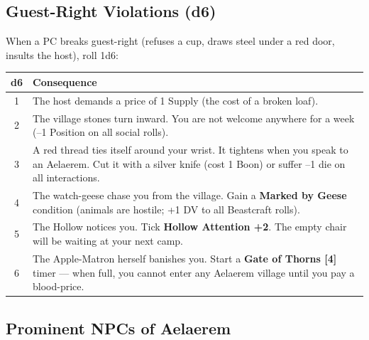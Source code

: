 \subsection*{Guest-Right Violations (d6)}
When a PC breaks guest-right (refuses a cup, draws steel under a red door, insults the host), roll 1d6:
\begin{center}
\begin{tabular}{|c|l|}
\hline
\textbf{d6} & \textbf{Consequence} \\
\hline
1 & The host demands a price of 1 Supply (the cost of a broken loaf). \\
2 & The village stones turn inward. You are not welcome anywhere for a week (--1 Position on all social rolls). \\
3 & A red thread ties itself around your wrist. It tightens when you speak to an Aelaerem. Cut it with a silver knife (cost 1 Boon) or suffer --1 die on all interactions. \\
4 & The watch-geese chase you from the village. Gain a \textbf{Marked by Geese} condition (animals are hostile; +1 DV to all Beastcraft rolls). \\
5 & The Hollow notices you. Tick \textbf{Hollow Attention +2}. The empty chair will be waiting at your next camp. \\
6 & The Apple-Matron herself banishes you. Start a \textbf{Gate of Thorns [4]} timer --- when full, you cannot enter any Aelaerem village until you pay a blood-price. \\
\hline
\end{tabular}
\end{center}

\subsection*{Prominent NPCs of Aelaerem}
\label{sec:aelaerem-npcs}

